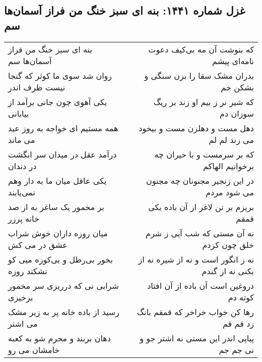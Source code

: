 \begin{center}
\section*{غزل شماره ۱۴۴۱: بنه ای سبز خنگ من فراز آسمان‌ها سم}
\label{sec:1441}
\begin{longtable}{l p{0.5cm} r}
بنه ای سبز خنگ من فراز آسمان‌ها سم
&&
که بنوشت آن مه بی‌کیف دعوت نامه‌ای پیشم
\\
روان شد سوی ما کوثر که گنجا نیست ظرف اندر
&&
بدران مشک سقا را بزن سنگی و بشکن خم
\\
یکی آهوی چون جانی برآمد از بیابانی
&&
که شیر نر ز بیم او زند بر ریگ سوزان دم
\\
همه مستیم ای خواجه به روز عید می ماند
&&
دهل مست و دهلزن مست و بیخود می زند لم لم
\\
درآمد عقل در میدان سر انگشت در دندان
&&
که بر سرمست و با حیران چه برخوانیم الهاکم
\\
یکی عاقل میان ما به دار وهم نمی‌یابند
&&
در این زنجیر مجنونان چه مجنون می شود مردم
\\
بر مخمور یک ساغر به از صد خانه پرزر
&&
بریزم بر تن لاغر از آن باده یکی قمقم
\\
میان روزه داران خوش شراب عشق در می کش
&&
نه آن مستی که شب آیی ز شرم خلق چون کزدم
\\
بخور بی‌رطل و بی‌کوزه میی کو نشکند روزه
&&
نه ز انگور است و نه از شیره نه از بکنی نه از گندم
\\
شرابی نی که درریزی سر مخمور برخیزی
&&
دروغین است آن باده از آن افتاد کوته دم
\\
رسید از باده خانه پر به زیر مشک می اشتر
&&
رها کن خواب خراخر که قمقم بانگ زد قم قم
\\
دهان بربند و محرم شو به کعبه خامشان می رو
&&
پیاپی اندر این مستی نه اشتر جو و نی جم جم
\\
\end{longtable}
\end{center}

